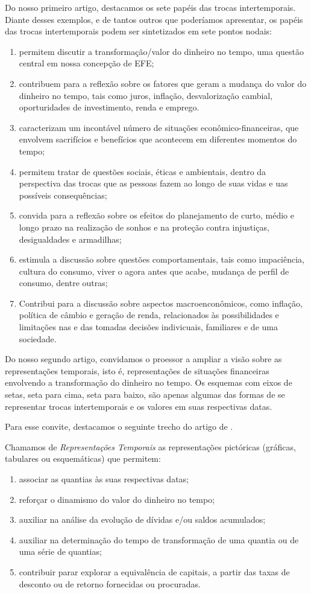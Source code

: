 \begin{paginatexto}
Do nosso primeiro artigo, destacamos os sete papéis das trocas intertemporais. Diante desses exemplos, e de tantos outros que poderíamos apresentar, os papéis das trocas intertemporais podem ser sintetizados em sete pontos nodais:
\begin{enumerate}
  \item permitem discutir a transformação/valor do dinheiro no tempo, uma questão central em nossa concepção de EFE;
  \item contribuem para a reflexão sobre os fatores que geram a mudança do valor do dinheiro no tempo, tais como juros, inflação, desvalorização cambial, oporturidades de investimento, renda e emprego.
  \item caracterizam um incontável número de situações econômico-financeiras, que envolvem sacrifícios e benefícios que acontecem em diferentes momentos do tempo;
  \item permitem tratar de questões sociais, éticas e ambientais, dentro da perspectiva das trocas que as pessoas fazem ao longo de suas vidas e uas possíveis consequências;
  \item convida para a reflexão sobre os efeitos do planejamento de curto, médio e longo prazo na realização de sonhos e na proteção contra injustiças, desigualdades e armadilhas;
  \item estimula a discussão sobre questões comportamentais, tais como impaciência, cultura do consumo, viver o agora antes que acabe, mudança de perfil de consumo, dentre outras;
  \item Contribui para a discussão sobre aspectos macroenconômicos, como inflação, política de câmbio e geração de renda, relacionados às possibilidades e limitações nas e das tomadas decisões indivicuais, familiares e de uma sociedade.
\end{enumerate}
  Do nosso segundo artigo, convidamos o proessor a ampliar a visão sobre as representações temporais, isto é, representações de situações financeiras envolvendo a transformação do dinheiro no tempo. Os esquemas com eixos de setas, seta para cima, seta para baixo, são apenas algumas das formas de se representar trocas intertemporais e os valores em suas respectivas datas.

  Para esse convite, destacamos o seguinte trecho do artigo de \cite[p. 125]{muniz2016b}.

  Chamamos de \textit{Representações Temporais} as representações pictóricas (gráficas, tabulares ou esquemáticas) que permitem:
  \begin{enumerate}
    \item associar as quantias às suas respectivas datas;
    \item reforçar o dinamismo do valor do dinheiro no tempo;
    \item auxiliar na análise da evolução de dívidas e/ou saldos acumulados;
    \item auxiliar na determinação do tempo de transformação de uma quantia ou de uma série de quantias;
    \item contribuir parar explorar a equivalência de capitais, a partir das taxas de desconto ou de retorno fornecidas ou procuradas.
  \end{enumerate}


\end{paginatexto}
